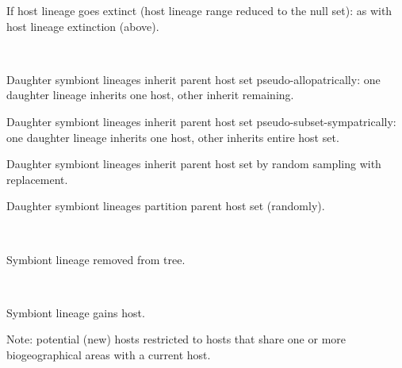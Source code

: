 \documentclass[11pt]{article}
\begin{document}
\begin{description}
\begin{minipage}[t]{\linewidth}
\begin{compactitem}
            \item If host lineage goes extinct (host lineage range reduced to the null set): as with host lineage extinction (above).
            \end{compactitem}
        \end{minipage}
    \item[Symbiont lineage speciation]  \hfill \\
        \begin{minipage}[t]{\linewidth}
            \begin{compactitem}
                \item Daughter symbiont lineages inherit parent host set pseudo-allopatrically: one daughter lineage inherits one host, other inherit remaining.
                \item Daughter symbiont lineages inherit parent host set pseudo-subset-sympatrically: one daughter lineage inherits one host, other inherits entire host set.
                \item Daughter symbiont lineages inherit parent host set by random sampling with replacement.
                \item Daughter symbiont lineages partition parent host set (randomly).
            \end{compactitem}
        \end{minipage}
    \item[Symbiont lineage extinction]  \hfill \\
        \begin{minipage}[t]{\linewidth}
            \begin{compactitem}
                \item Symbiont lineage removed from tree.
            \end{compactitem}
        \end{minipage}
    \item[Symbiont lineage host gain]  \hfill \\
        \begin{minipage}[t]{\linewidth}
            \begin{compactitem}
                \item Symbiont lineage gains host.
                \item Note: potential (new) hosts restricted to hosts that share one or more biogeographical areas with a current host.
            \end{compactitem}
        \end{minipage}

\end{description}
\end{document}
